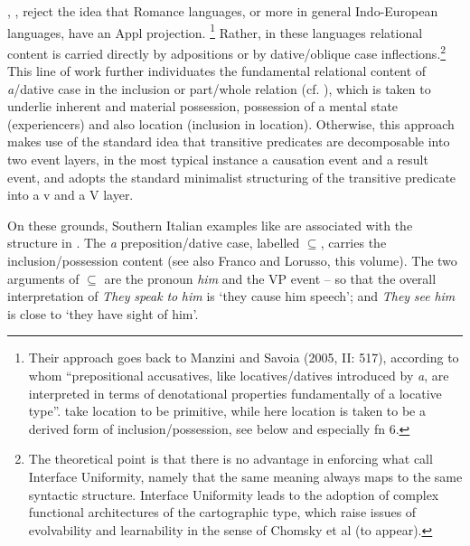 \documentclass[output=paper]{langscibook}
\begin{document}

\citet{ManziniSavoia2010}, \citet{Manzini2012}, \citet{ManziniFranco2016} reject the idea that Romance languages, or more in general Indo-European languages, have an Appl projection.{} \footnote{Their approach goes back to Manzini and Savoia (2005, II: 517), according to whom “prepositional accusatives, like locatives/datives introduced by \textit{a}, are interpreted in terms of denotational properties fundamentally of a locative type”. \citet{ManziniSavoia2005} take location to be primitive, while here location is taken to be a derived form of inclusion/possession, see below and especially fn 6.}   Rather, in these languages relational content is carried directly by adpositions or by dative/oblique case inflections.\footnote{The theoretical point is that there is no advantage in enforcing what \citet{CulicoverJackendoff2005} call Interface Uniformity, namely that the same meaning always maps to the same syntactic structure. Interface Uniformity leads to the adoption of complex functional architectures of the cartographic type, which raise issues of evolvability and learnability in the sense of Chomsky et al (to appear).} This line of work further individuates the fundamental relational content of \textit{a}/dative case in the inclusion or part/whole relation (cf. \citealt{BelvindenDikken1997}), which is taken to underlie inherent and material possession, possession of a mental state (experiencers) and also location (inclusion in location). Otherwise, this approach makes use of the standard idea that transitive predicates are decomposable into two event layers, in the most typical instance a causation event and a result event, and adopts the standard minimalist structuring of the transitive predicate into a v and a V layer. 

On these grounds, Southern Italian examples like  are associated with the structure in . The \textit{a} preposition/dative case, labelled  ${\subseteq}$, carries the inclusion/possession content (see also Franco and Lorusso, this volume). The two arguments of ${\subseteq}$ are the pronoun \textit{him} and the VP event – so that the overall interpretation of \textit{They} \textit{speak} \textit{to} \textit{him} is ‘they cause him speech’; and \textit{They} \textit{see} \textit{him} is close to ‘they have sight of him’.  
\end{document}
